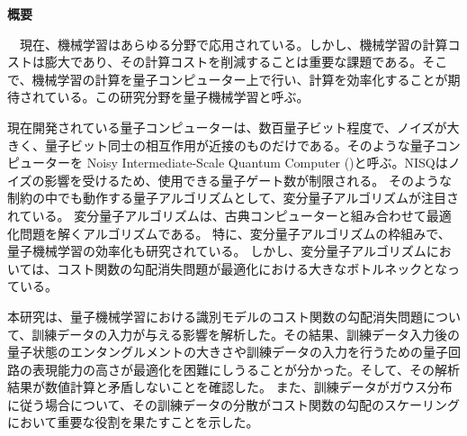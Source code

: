 \thispagestyle{empty}
\null\vspace{\fill}

\begin{center}
    \textbf{\Large 概要}
\end{center}
　現在、機械学習はあらゆる分野で応用されている。しかし、機械学習の計算コストは膨大であり、その計算コストを削減することは重要な課題である。そこで、機械学習の計算を量子コンピューター上で行い、計算を効率化することが期待されている。この研究分野を量子機械学習と呼ぶ。

現在開発されている量子コンピューターは、数百量子ビット程度で、ノイズが大きく、量子ビット同士の相互作用が近接のものだけである。そのような量子コンピューターを Noisy Intermediate-Scale Quantum Computer ()と呼ぶ。NISQはノイズの影響を受けるため、使用できる量子ゲート数が制限される。
そのような制約の中でも動作する量子アルゴリズムとして、変分量子アルゴリズムが注目されている。
変分量子アルゴリズムは、古典コンピューターと組み合わせて最適化問題を解くアルゴリズムである。
特に、変分量子アルゴリズムの枠組みで、量子機械学習の効率化も研究されている。
しかし、変分量子アルゴリズムにおいては、コスト関数の勾配消失問題が最適化における大きなボトルネックとなっている。

本研究は、量子機械学習における識別モデルのコスト関数の勾配消失問題について、訓練データの入力が与える影響を解析した。その結果、訓練データ入力後の量子状態のエンタングルメントの大きさや訓練データの入力を行うための量子回路の表現能力の高さが最適化を困難にしうることが分かった。そして、その解析結果が数値計算と矛盾しないことを確認した。
また、訓練データがガウス分布に従う場合について、その訓練データの分散がコスト関数の勾配のスケーリングにおいて重要な役割を果たすことを示した。

\vspace{\fill}
